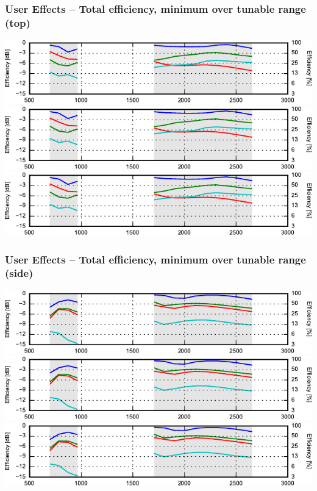 \begin{frame}
    \frametitle{User Effects -- Total efficiency, minimum over tunable range (top)}
    \begin{center}
        \includegraphics{img/soren/ue/design2sn/efftop.pdf}\\
        \includegraphics{img/soren/ue/design2sn/efftop.pdf}\\
        \includegraphics{img/soren/ue/design2sn/efftop.pdf}
    \end{center}
    \legendfooter
\end{frame}

\begin{frame}
    \frametitle{User Effects -- Total efficiency, minimum over tunable range (side)}
    \begin{center}
        \includegraphics{img/soren/ue/design2sn/effside.pdf}\\
        \includegraphics{img/soren/ue/design2sn/effside.pdf}\\
        \includegraphics{img/soren/ue/design2sn/effside.pdf}
    \end{center}
    \legendfooter
\end{frame}

